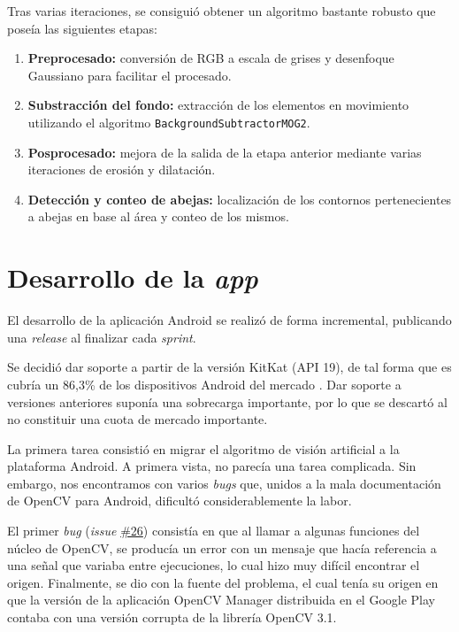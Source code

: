 Tras varias iteraciones, se consiguió obtener un algoritmo bastante
robusto que poseía las siguientes etapas:

\begin{enumerate}
\def\labelenumi{\arabic{enumi}.}
\tightlist
\item
  \textbf{Preprocesado:} conversión de RGB a escala de grises y
  desenfoque Gaussiano para facilitar el procesado.
\item
  \textbf{Substracción del fondo:} extracción de los elementos en
  movimiento utilizando el algoritmo \texttt{BackgroundSubtractorMOG2}.
\item
  \textbf{Posprocesado:} mejora de la salida de la etapa anterior
  mediante varias iteraciones de erosión y dilatación.
\item
  \textbf{Detección y conteo de abejas:} localización de los contornos
  pertenecientes a abejas en base al área y conteo de los mismos.
\end{enumerate}

\section{Desarrollo de la \emph{app}}\label{desarrollo-de-la-app}

El desarrollo de la aplicación Android se realizó de forma incremental,
publicando una \emph{release} al finalizar cada \emph{sprint}.

Se decidió dar soporte a partir de la versión KitKat (API 19), de tal
forma que es cubría un 86,3\% de los dispositivos Android del mercado
\citep{android:versions}. Dar soporte a versiones anteriores suponía una 
sobrecarga importante, por lo que se descartó al no constituir una cuota de
mercado importante.

La primera tarea consistió en migrar el algoritmo de visión artificial a
la plataforma Android. A primera vista, no parecía una tarea complicada.
Sin embargo, nos encontramos con varios \emph{bugs} que, unidos a la
mala documentación de OpenCV para Android, dificultó considerablemente
la labor.

El primer \emph{bug} (\emph{issue}
\href{https://github.com/davidmigloz/go-bees/issues/26}{\#26}) consistía
en que al llamar a algunas funciones del núcleo de OpenCV, se producía
un error con un mensaje que hacía referencia a una señal que variaba
entre ejecuciones, lo cual hizo muy difícil encontrar el origen.
Finalmente, se dio con la fuente del problema, el cual tenía su origen
en que la versión de la aplicación OpenCV Manager distribuida en el
Google Play contaba con una versión corrupta de la librería OpenCV 3.1.

